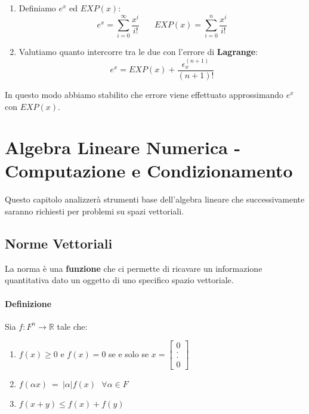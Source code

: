 \documentclass{article}
\begin{document}
\begin{enumerate}
    \item Definiamo $e^x$ ed $EXP(x)$:
    \[ \boxed{e^{x} = \sum^{\infty}_{i=0} \frac{x^{i}}{i!}} \: \: \: \: \: \: \: \: \boxed{EXP(x) = \sum^{n}_{i=0} \frac{x^{i}}{i!}} \]
    \item Valutiamo quanto intercorre tra le due con l'errore di \textbf{Lagrange}:
    \[ e^x = EXP(x) + \frac{\epsilon^{(n+1)}_{x}}{(n+1)!} \]
\end{enumerate}

In questo modo abbiamo stabilito che errore viene effettuato approssimando $e^x$ con $EXP(x)$.

\newpage

\section{Algebra Lineare Numerica - Computazione e Condizionamento}

Questo capitolo analizzerà strumenti base dell'algebra lineare che successivamente saranno richiesti per problemi su spazi vettoriali.

\subsection{Norme Vettoriali}

La norma è una \textbf{funzione} che ci permette di ricavare un informazione quantitativa dato un oggetto di uno specifico spazio vettoriale.

\paragraph{Definizione} Sia $f: F^{n} \xrightarrow{} \mathbb{R}$ tale che:

\begin{enumerate}
    \item $f(x) \geq 0 $ e $f(x) = 0$ se e solo se $x = \begin{bmatrix}
0 \\
. \\
. \\
0
\end{bmatrix}$

    \item $f(\alpha x) \: = \: |\alpha|f(x) \: \: \: \forall \alpha \in F $
    \item $f(x+y) \leq f(x) + f(y)$
\end{enumerate}
\end{document}
